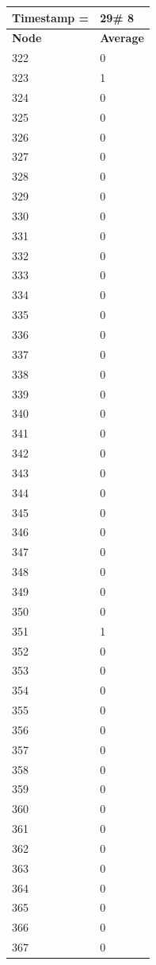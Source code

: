 \begin{tabular}{|l||l|}
\hline
\textbf{Timestamp =} & \textbf{29}\# 8\\\hline
	\textbf{Node} & \textbf{Average} \\ \hline
\hline
	322 & 0 \\ \hline
	323 & 1 \\ \hline
	324 & 0 \\ \hline
	325 & 0 \\ \hline
	326 & 0 \\ \hline
	327 & 0 \\ \hline
	328 & 0 \\ \hline
	329 & 0 \\ \hline
	330 & 0 \\ \hline
	331 & 0 \\ \hline
	332 & 0 \\ \hline
	333 & 0 \\ \hline
	334 & 0 \\ \hline
	335 & 0 \\ \hline
	336 & 0 \\ \hline
	337 & 0 \\ \hline
	338 & 0 \\ \hline
	339 & 0 \\ \hline
	340 & 0 \\ \hline
	341 & 0 \\ \hline
	342 & 0 \\ \hline
	343 & 0 \\ \hline
	344 & 0 \\ \hline
	345 & 0 \\ \hline
	346 & 0 \\ \hline
	347 & 0 \\ \hline
	348 & 0 \\ \hline
	349 & 0 \\ \hline
	350 & 0 \\ \hline
	351 & 1 \\ \hline
	352 & 0 \\ \hline
	353 & 0 \\ \hline
	354 & 0 \\ \hline
	355 & 0 \\ \hline
	356 & 0 \\ \hline
	357 & 0 \\ \hline
	358 & 0 \\ \hline
	359 & 0 \\ \hline
	360 & 0 \\ \hline
	361 & 0 \\ \hline
	362 & 0 \\ \hline
	363 & 0 \\ \hline
	364 & 0 \\ \hline
	365 & 0 \\ \hline
	366 & 0 \\ \hline
	367 & 0 \\ \hline
\end{tabular}
